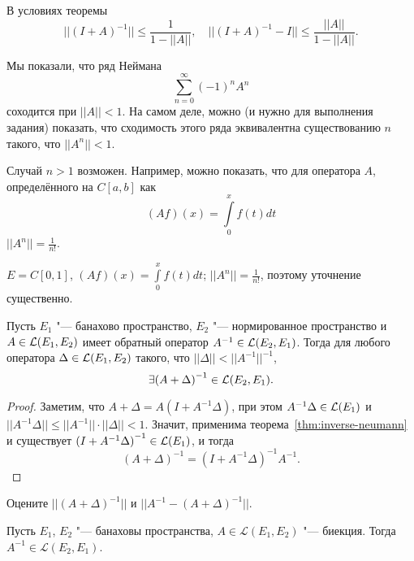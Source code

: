 \documentclass[main]{subfiles}
\begin{document}
\begin{corollary}
  В условиях теоремы
  \[
    ||(I + A)^{-1}|| \le \frac{1}{1 - ||A||}, \quad
    ||(I + A)^{-1} - I|| \le \frac{||A||}{1 - ||A||}.
  \]
\end{corollary}

\begin{remark}
  Мы показали, что ряд Неймана
  \[
    \sum_{n=0}^\infty (-1)^n A^n
  \]
  соходится при \( ||A|| < 1 \).
  На самом деле, можно (и нужно для выполнения задания)
  показать, что сходимость этого ряда эквивалентна
  существованию \( n \) такого, что \( ||A^n|| < 1 \).
\end{remark}

\begin{example}
  Случай \( n > 1 \) возможен.
  Например, можно показать, что для
  оператора \( A \),
  определённого на \( C[a, b] \) как
  \[
    (Af)(x) = \int\limits_0^x f(t) dt
  \]
  \( ||A^n|| = \frac{1}{n!} \).
\end{example}

\begin{example}
  \( E = C[0, 1] \), \( (Af)(x) = \int\limits_0^x f(t) dt \);
  \( ||A^n|| = \frac{1}{n!} \), поэтому уточнение существенно.
\end{example}

\begin{theorem} %
  Пусть \( E_1 \) "--- банахово пространство,
  \( E_2 \) "--- нормированное пространство
  и \( A \in \Linears{E_1}[E_2] \)
  имеет обратный оператор
  \( A^{-1} \in \Linears{E_2}[E_1] \).
  Тогда для любого оператора
  \( \Delta \in \Linears{E_1}[E_2] \)
  такого, что \( ||\Delta|| < ||A^{-1}||^{-1} \),
  \[
    \exists {(A + \Delta)}^{-1} \in \Linears{E_2}[E_1].
  \]
\end{theorem}
\begin{proof}
  Заметим, что
  \( A + \Delta = A (I + A^{-1} \Delta) \),
  при этом \( A^{-1} \Delta \in \Linears{E_1} \)
  и \( ||A^{-1} \Delta|| \le ||A^{-1}|| \cdot ||\Delta|| < 1 \).
  Значит, применима теорема~\ref{thm:inverse-neumann}
  и существует \( {(I + A^{-1} \Delta)}^{-1} \in \Linears{E_1} \),
  и тогда
  \[
    {(A + \Delta)}^{-1} = {(I + A^{-1} \Delta)}^{-1} A^{-1}.
  \]
\end{proof}

\begin{exercise}
  Оцените \( ||{(A + \Delta)}^{-1}|| \)
  и \( ||A^{-1} - {(A + \Delta)}^{-1}|| \).
\end{exercise}

\begin{theorem} %
  Пусть \( E_1 \), \( E_2 \) "--- банаховы пространства,
  \( A \in \mathcal{L}(E_1, E_2) \) "--- биекция.
  Тогда \( A^{-1} \in \mathcal{L}(E_2, E_1) \).
\end{theorem}
\end{document}

